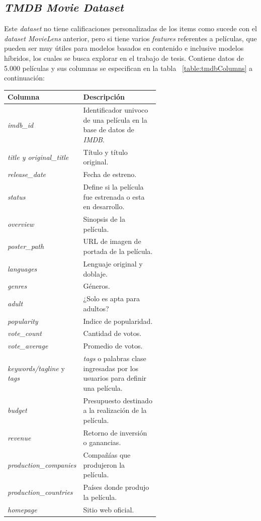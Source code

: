 \documentclass[11pt,a4paper,twoside]{thesis}
\begin{document}
\clearpage

\subsection{\textit{TMDB Movie Dataset}}

Este \textit{dataset} \cite{tmdb} no tiene calificaciones personalizadas de los items como sucede con el \textit{dataset MovieLens} anterior, pero si tiene varios \textit{features} referentes a películas, que pueden ser muy útiles para modelos basados en contenido e inclusive modelos híbridos, los cuales se busca explorar en el trabajo de tesis. Contiene datos de 5.000 películas y sus columnas se especifican en la tabla ~\ref{table:tmdbColumns} a continuación:


\begin{table}[!htb]
	\centering
	\footnotesize
	\begin{tabular}{l | p{0.6\linewidth}}
	\hline
		Columna                      & Descripción \\
	\hline
	\textit{imdb\_id}                & Identificador univoco de una película en la base de datos de \textit{IMDB}. \\
	\textit{title y original\_title} & Título y título original. \\
	\textit{release\_date}           & Fecha de estreno. \\
	\textit{status}                  & Define si la película fue estrenada o esta en desarrollo. \\
	\textit{overview}                & Sinopsis de la película. \\
	\textit{poster\_path}            & URL de imagen de portada de la película. \\ 
	\textit{languages}               & Lenguaje original y doblaje. \\
	\textit{genres}                  & Géneros. \\
	\textit{adult}                   & ¿Solo es apta para adultos? \\
	\textit{popularity}              & Indice de popularidad. \\
	\textit{vote\_count}      		 & Cantidad de votos. \\
	\textit{vote\_average}      		 & Promedio de votos. \\
	\textit{keywords/tagline} y \textit{tags} & \textit{tags} o palabras clase ingresadas por los usuarios para definir una película. \\
	\textit{budget}                  & Presupuesto destinado a la realización de la película. \\
	\textit{revenue}          	     & Retorno de inversión o ganancias. \\
	\textit{production\_companies}    & Compañías que produjeron la película. \\ 
	\textit{production\_countries}    & Países donde produjo la película. \\ 
	\textit{homepage}                & Sitio web oficial. \\


\end{tabular}
\end{table}
\end{document}
